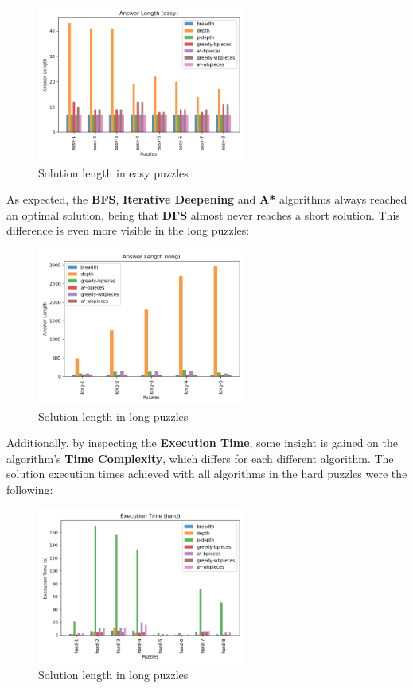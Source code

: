 \documentclass[conference]{IEEEtran}
\begin{document}
\begin{figure}[H]
    \centerline{\includegraphics[width=260px]{../../graphics/answerLength-easy.png}}
    \caption{Solution length in easy puzzles}
\end{figure}

As expected, the \textbf{BFS}, \textbf{Iterative Deepening} and \textbf{A*} algorithms always reached an optimal solution, being that \textbf{DFS} almost never reaches a short solution. This difference is even more visible in the long puzzles:

\begin{figure}[H]
    \centerline{\includegraphics[width=260px]{../../graphics/answerLength-long.png}}
    \caption{Solution length in long puzzles}
\end{figure}

Additionally, by inspecting the \textbf{Execution Time}, some insight is gained on the algorithm's \textbf{Time Complexity}, which differs for each different algorithm. The solution execution times achieved with all algorithms in the hard puzzles were the following:

\begin{figure}[H]
    \centerline{\includegraphics[width=260px]{../../graphics/executionTime-hard.png}}
    \caption{Solution length in long puzzles}
\end{figure}
\end{document}
